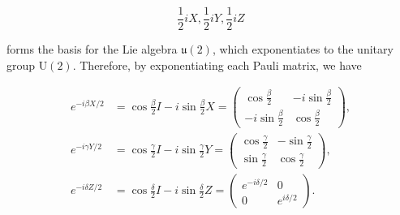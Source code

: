 \documentclass{article}
\theoremstyle{definition}
\begin{document}
\[\frac{1}{2} i X, \frac{1}{2} i Y, \frac{1}{2} i Z\]

forms the basis for the Lie algebra $\mathfrak{u}(2)$, which exponentiates to the unitary group $\text{U}(2)$. Therefore, by exponentiating each Pauli matrix, we have

\begin{align*}
  e^{-i \beta X /2} &= \cos \frac{\beta}{2} I - i \sin \frac{\beta}{2} X = \begin{pmatrix} \cos \frac{\beta}{2} & -i \sin \frac{\beta}{2} \\ -i \sin \frac{\beta}{2} & \cos \frac{\beta}{2} \end{pmatrix}, \\
  e^{-i \gamma Y/2} &= \cos \frac{\gamma}{2} I - i \sin \frac{\gamma}{2} Y = \begin{pmatrix} \cos \frac{\gamma}{2} & - \sin \frac{\gamma}{2} \\ \sin \frac{\gamma}{2} & \cos \frac{\gamma}{2} \end{pmatrix}, \\
  e^{-i \delta Z/2} &= \cos \frac{\delta}{2} I - i \sin \frac{\delta}{2} Z = \begin{pmatrix} e^{-i \delta /2} & 0 \\ 0 & e^{i\delta/2} \end{pmatrix}.
\end{align*}
\end{document}
